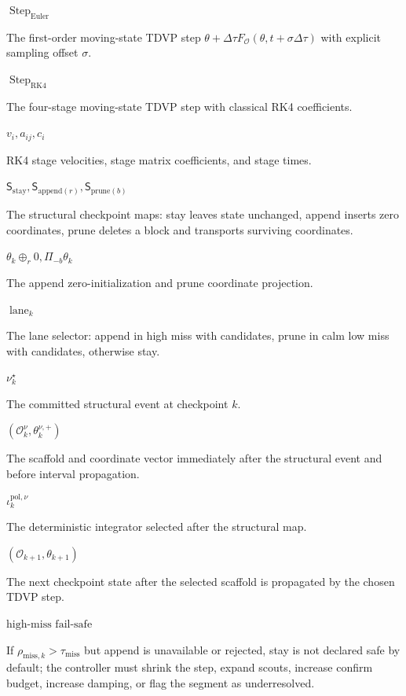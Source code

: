\documentclass[10pt]{article}
\newcommand{\sym}[2]{%
  \noindent\begin{minipage}[t]{0.29\textwidth}\raggedright\textbf{\ensuremath{#1}}\end{minipage}%
  \hfill
  \begin{minipage}[t]{0.68\textwidth}\raggedright #2\end{minipage}\par\vspace{0.22em}}
\begin{document}
\sym{\operatorname{Step}_{\mathrm{Euler}}}{The first-order moving-state TDVP step $\theta+\Delta\tau F_{\mathcal O}(\theta,t+\sigma\Delta\tau)$ with explicit sampling offset $\sigma$.}
\sym{\operatorname{Step}_{\mathrm{RK4}}}{The four-stage moving-state TDVP step with classical RK4 coefficients.}
\sym{v_i,a_{ij},c_i}{RK4 stage velocities, stage matrix coefficients, and stage times.}
\sym{\mathsf S_{\mathrm{stay}},\mathsf S_{\mathrm{append}(r)},\mathsf S_{\mathrm{prune}(b)}}{The structural checkpoint maps: stay leaves state unchanged, append inserts zero coordinates, prune deletes a block and transports surviving coordinates.}
\sym{\theta_k\oplus_r0,\Pi_{-b}\theta_k}{The append zero-initialization and prune coordinate projection.}
\sym{\operatorname{lane}_k}{The lane selector: append in high miss with candidates, prune in calm low miss with candidates, otherwise stay.}
\sym{\nu_k^\star}{The committed structural event at checkpoint $k$.}
\sym{(\mathcal O_k^\nu,\theta_k^{\nu,+})}{The scaffold and coordinate vector immediately after the structural event and before interval propagation.}
\sym{\iota_k^{\mathrm{pol},\nu}}{The deterministic integrator selected after the structural map.}
\sym{(\mathcal O_{k+1},\theta_{k+1})}{The next checkpoint state after the selected scaffold is propagated by the chosen TDVP step.}
\sym{\text{high-miss fail-safe}}{If $\rho_{\mathrm{miss},k}>\tau_{\mathrm{miss}}$ but append is unavailable or rejected, stay is not declared safe by default; the controller must shrink the step, expand scouts, increase confirm budget, increase damping, or flag the segment as underresolved.}
\end{document}
